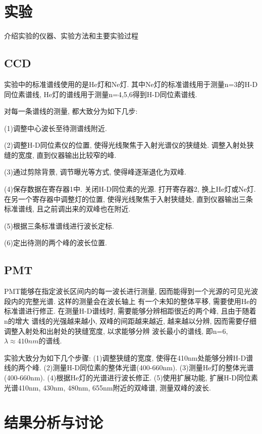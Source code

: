 \documentclass[12pt,a4paper]{article}
\begin{document}
\section{实验}
介绍实验的仪器、实验方法和主要实验过程

\subsection{CCD}
实验中的标准谱线使用的是He灯和Ne灯. 其中Ne灯的标准谱线用于测量n=3的H-D同位素谱线, He灯的谱线用于测量n=4,5,6得到H-D同位素谱线. 

对每一条谱线的测量, 都大致分为如下几步: 

(1)调整中心波长至待测谱线附近. 

(2)调整H-D同位素仪的位置, 使得光线聚焦于入射光谱仪的狭缝处. 调整入射处狭缝的宽度, 直到仪器输出比较窄的峰. 

(3)通过剪除背景, 调节曝光等方式, 使得峰逐渐退化为双峰. 

(4)保存数据在寄存器1中. 关闭H-D同位素的光源. 
打开寄存器2, 换上He灯或Ne灯. 在另一个寄存器中调整灯的位置, 使得光线聚焦于入射狭缝处, 直到仪器输出三条标准谱线, 
且之前调出来的双峰也在附近. 

(5)根据三条标准谱线进行波长定标. 

(6)定出待测的两个峰的波长位置. 

\subsection{PMT}
PMT能够在指定波长区间内的每一波长进行测量, 因而能得到一个光源的可见光波段内的完整光谱. 这样的测量会在波长轴上
有一个未知的整体平移, 需要使用He的标准谱进行修正. 在测量H-D谱线时, 需要能够分辨相距很近的两个峰, 且由于随着n的增大
谱线的光强越来越小, 双峰的间距越来越近, 越来越以分辨, 因而需要仔细调整入射处和出射处的狭缝宽度, 以求能够分辨
波长最小的谱线, 即n=6, $\lambda \approx 410nm$的谱线. 

实验大致分为如下几个步骤: 
(1)调整狭缝的宽度, 使得在410nm处能够分辨H-D谱线的两个峰. 
(2)测量H-D同位素的整体光谱(400-660nm). 
(3)测量He灯的整体光谱(400-660nm).
(4)根据He灯的光谱进行波长修正. 
(5)使用扩展功能, 扩展H-D同位素光谱410nm, 430nm, 480nm, 655nm附近的双峰谱, 测量双峰的波长. 

\section{结果分析与讨论}
\end{document}
